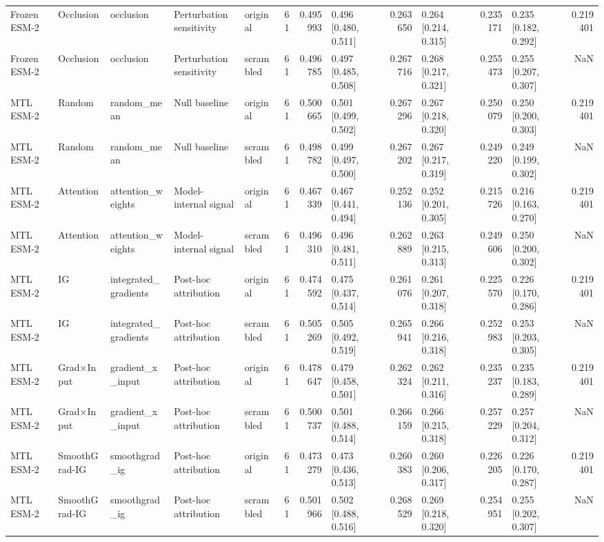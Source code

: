 \begin{tabular}{lllllrrlrlrlr}
Frozen ESM-2 & Occlusion & occlusion & Perturbation sensitivity & original & 61 & 0.495993 & 0.496 [0.480, 0.511] & 0.263650 & 0.264 [0.214, 0.315] & 0.235171 & 0.235 [0.182, 0.292] & 0.219401 \\
Frozen ESM-2 & Occlusion & occlusion & Perturbation sensitivity & scrambled & 61 & 0.496785 & 0.497 [0.485, 0.508] & 0.267716 & 0.268 [0.217, 0.321] & 0.255473 & 0.255 [0.207, 0.307] & NaN \\
MTL ESM-2 & Random & random_mean & Null baseline & original & 61 & 0.500665 & 0.501 [0.499, 0.502] & 0.267296 & 0.267 [0.218, 0.320] & 0.250079 & 0.250 [0.200, 0.303] & 0.219401 \\
MTL ESM-2 & Random & random_mean & Null baseline & scrambled & 61 & 0.498782 & 0.499 [0.497, 0.500] & 0.267202 & 0.267 [0.217, 0.319] & 0.249220 & 0.249 [0.199, 0.302] & NaN \\
MTL ESM-2 & Attention & attention_weights & Model-internal signal & original & 61 & 0.467339 & 0.467 [0.441, 0.494] & 0.252136 & 0.252 [0.201, 0.305] & 0.215726 & 0.216 [0.163, 0.270] & 0.219401 \\
MTL ESM-2 & Attention & attention_weights & Model-internal signal & scrambled & 61 & 0.496310 & 0.496 [0.481, 0.511] & 0.262889 & 0.263 [0.215, 0.313] & 0.249606 & 0.250 [0.200, 0.302] & NaN \\
MTL ESM-2 & IG & integrated_gradients & Post-hoc attribution & original & 61 & 0.474592 & 0.475 [0.437, 0.514] & 0.261076 & 0.261 [0.207, 0.318] & 0.225570 & 0.226 [0.170, 0.286] & 0.219401 \\
MTL ESM-2 & IG & integrated_gradients & Post-hoc attribution & scrambled & 61 & 0.505269 & 0.505 [0.492, 0.519] & 0.265941 & 0.266 [0.216, 0.318] & 0.252983 & 0.253 [0.203, 0.305] & NaN \\
MTL ESM-2 & Grad×Input & gradient_x_input & Post-hoc attribution & original & 61 & 0.478647 & 0.479 [0.458, 0.501] & 0.262324 & 0.262 [0.211, 0.316] & 0.235237 & 0.235 [0.183, 0.289] & 0.219401 \\
MTL ESM-2 & Grad×Input & gradient_x_input & Post-hoc attribution & scrambled & 61 & 0.500737 & 0.501 [0.488, 0.514] & 0.266159 & 0.266 [0.215, 0.318] & 0.257229 & 0.257 [0.204, 0.312] & NaN \\
MTL ESM-2 & SmoothGrad-IG & smoothgrad_ig & Post-hoc attribution & original & 61 & 0.473279 & 0.473 [0.436, 0.513] & 0.260383 & 0.260 [0.206, 0.317] & 0.226205 & 0.226 [0.170, 0.287] & 0.219401 \\
MTL ESM-2 & SmoothGrad-IG & smoothgrad_ig & Post-hoc attribution & scrambled & 61 & 0.501966 & 0.502 [0.488, 0.516] & 0.268529 & 0.269 [0.218, 0.320] & 0.254951 & 0.255 [0.202, 0.307] & NaN \\

\end{tabular}
